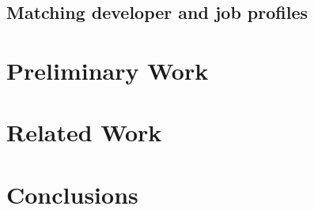 \documentclass{sig-alternate}
\begin{document}
\subsection{Matching developer and job profiles}


\section{Preliminary Work}

\section{Related Work}

\section{Conclusions}



\end{document}
